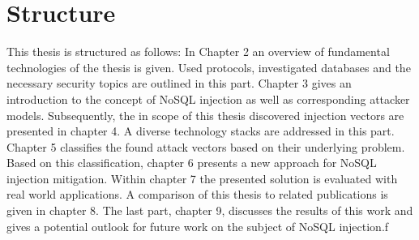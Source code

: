 \section{Structure}
This thesis is  structured as follows: In Chapter 2 an overview of fundamental technologies of the thesis is given. Used protocols, investigated databases and the necessary security topics are outlined in this part. Chapter 3 gives an introduction to the concept of NoSQL injection as well as corresponding attacker models. Subsequently, the in scope of this thesis discovered injection vectors are presented in chapter 4. A diverse technology stacks are addressed in this part. Chapter 5 classifies the found attack vectors based on their underlying problem. Based on this classification, chapter 6 presents a new approach for NoSQL injection mitigation. Within chapter 7 the presented solution is evaluated with real world applications. A comparison of this thesis to related publications is given in chapter 8. The last part, chapter 9, discusses the results of this work and gives a potential outlook for future work on the subject of NoSQL injection.f